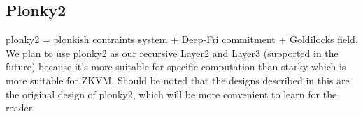 \subsection{Plonky2} \label{sec:Plonky2}

plonky2 = plonkish contraints system + Deep-Fri commitment + Goldilocks field. We plan to use plonky2 as our recursive Layer2 and Layer3 (supported in the future) because it's more suitable
for specific computation than starky which is more suitable for ZKVM. Should be noted that the designs described in this are the original design of plonky2, which will be more convenient to learn for
the reader.




